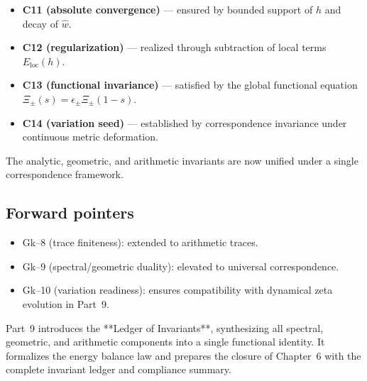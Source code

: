 \begin{remark}
\label{rem:compliance-summary-ch6p8}
\begin{itemize}[leftmargin=*, itemsep=2pt]
  \item \textbf{C11 (absolute convergence)} — ensured by bounded support of $h$ and decay of $\widehat{w}$. %
  \item \textbf{C12 (regularization)} — realized through subtraction of local terms $E_{\mathrm{loc}}(h)$. %
  \item \textbf{C13 (functional invariance)} — satisfied by the global functional equation $\Xi_\pm(s)=\epsilon_\pm\Xi_\pm(1-s)$. %
  \item \textbf{C14 (variation seed)} — established by correspondence invariance under continuous metric deformation. %
\end{itemize}
The analytic, geometric, and arithmetic invariants are now unified under a single correspondence framework. %
\end{remark}

\subsection{Forward pointers}
\label{subsec:ch6-part8-forward} \relax

\begin{itemize}[leftmargin=*, itemsep=2pt]
  \item Gk–8 (trace finiteness): extended to arithmetic traces. %
  \item Gk–9 (spectral/geometric duality): elevated to universal correspondence. %
  \item Gk–10 (variation readiness): ensures compatibility with dynamical zeta evolution in Part~9. %
\end{itemize}

Part~9 introduces the **Ledger of Invariants**, synthesizing all spectral, geometric, and arithmetic components into a single functional identity.  
It formalizes the energy balance law and prepares the closure of Chapter~6 with the complete invariant ledger and compliance summary. %



